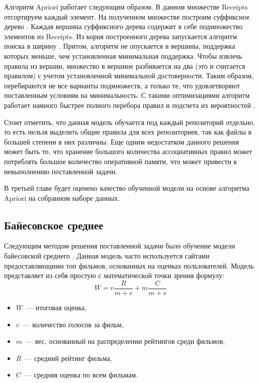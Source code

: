 Алгоритм Apriori работает следующим образом. В данном множестве $\text{Receipts}$ отсортируем каждый элемент. На полученном множестве построим суффиксное дерево \cite{trie}. Каждая вершина суффиксного дерева содержит в себе подмножество элементов из $\text{Receipts}$. Из корня построенного дерева запускается алгоритм поиска в ширину \cite{alghorithms}. Притом, алгоритм не опускается в вершины, поддержка которых меньше, чем установленная минимальная поддержка. Чтобы извлечь правила из вершин, множество в вершине разбивается на два (это и считается правилом) с учетом установленной минимальной достоверности. Таким образом, перебираются не все варианты подмножеств, а только те, что удовлетворяют поставленным условиям на минимальность. С такими оптимизациями алгоритм работает намного быстрее полного перебора правил и подсчета их вероятностей \cite{apriori}. 

Стоит отметить, что данная модель обучается под каждый репозиторий отдельно, то есть нельзя выделить общие правила для всех репозиториев, так как файлы в большей степени в них различны. Еще одним недостатком данного решения может быть то, что хранение большого количества ассоциативных правил может потреблять большое количество оперативной памяти, что может привести к невыполнению поставленной задачи.

В третьей главе будет оценено качество обученной модели на основе алгоритма Apriori на собранном наборе данных.
    \subsection{Байесовское среднее}\label{chapter-2-bayes}
Следующим методом решения поставленной задачи было обучение модели байесовской среднего \cite{bayesian-average}. Данная модель часто используется сайтами предоставляющими топ фильмов, основанных на оценках пользователей. Модель представляет из себя простую с математической точки зрения формулу:
    \begin{equation}\label{bayes-formula}
        W = v\frac{R}{m + v} + m\frac{C}{m + v}    
    \end{equation}

    \begin{itemize}
        \item $W$~--- итоговая оценка,
        \item $v$~--- количество голосов за фильм,
        \item $m$~--- вес, основанный на распределении рейтингов среди фильмов,
        \item $R$~--- средний рейтинг фильма,
        \item ${C}$~--- средняя оценка по всем фильмам.
    \end{itemize}

